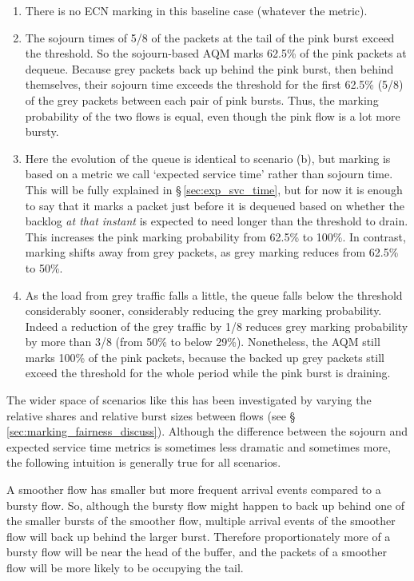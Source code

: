 \begin{enumerate}[nosep, label=\alph*)]
	\item There is no ECN marking in this baseline case (whatever the metric).
	\item The sojourn times of 5/8 of the packets at the tail of the pink burst exceed the threshold. So the sojourn-based AQM marks 62.5\% of the pink packets at dequeue. Because grey packets back up behind the pink burst, then behind themselves, their sojourn time exceeds the threshold for the first 62.5\% (5/8) of the grey packets between each pair of pink bursts. Thus, the marking probability of the two flows is equal, even though the pink flow is a lot more bursty.
	\item Here the evolution of the queue is identical to scenario (b), but marking is based on a metric we call `expected service time' rather than sojourn time. This will be fully explained in \S\,\ref{sec:exp_svc_time}, but for now it is enough to say that it marks a packet just before it is dequeued based on whether the backlog \emph{at that instant} is expected to need longer than the threshold to drain. This increases the pink marking probability from 62.5\% to 100\%. In contrast, marking shifts away from grey packets, as grey marking reduces from 62.5\% to 50\%.
	\item As the load from grey traffic falls a little, the queue falls below the threshold considerably sooner, considerably reducing the grey marking probability. Indeed a reduction of the grey traffic by 1/8 reduces grey marking probability by more than 3/8 (from 50\% to below 29\%). Nonetheless, the AQM still marks 100\% of the pink packets, because the backed up grey packets still exceed the threshold for the whole period while the pink burst is draining.
\end{enumerate}

The wider space of scenarios like this has been investigated by varying the relative shares and relative burst sizes between flows (see \S\,\ref{sec:marking_fairness_discuss}). Although the difference between the sojourn and expected service time metrics is sometimes less dramatic and sometimes more, the following intuition is generally true for all scenarios.

A smoother flow has smaller but more frequent arrival events compared to a bursty flow. So, although the bursty flow might happen to back up behind one of the smaller bursts of the smoother flow, multiple arrival events of the smoother flow will back up behind the larger burst. Therefore proportionately more of a bursty flow will be near the head of the buffer, and the packets of a smoother flow will be more likely to be occupying the tail.

